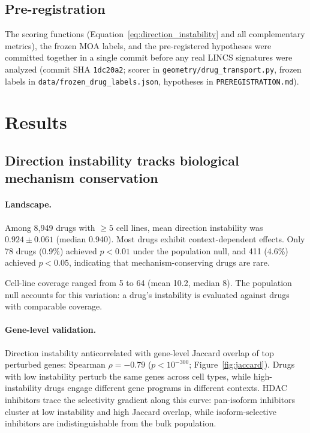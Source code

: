 \documentclass[11pt]{article}
\begin{document}
\subsection{Pre-registration}
\label{sec:prereg}

The scoring functions (Equation~\ref{eq:direction_instability} and all
complementary metrics), the frozen MOA labels, and the pre-registered
hypotheses were committed together in a single commit before any real
LINCS signatures were analyzed (commit SHA \texttt{1dc20a2}; scorer in
\texttt{geometry/drug\_transport.py}, frozen labels in
\texttt{data/frozen\_drug\_labels.json}, hypotheses in
\texttt{PREREGISTRATION.md}).

\section{Results}

\subsection{Direction instability tracks biological mechanism conservation}

\paragraph{Landscape.}

Among 8{,}949 drugs with $\geq5$ cell lines, mean direction instability
was $0.924 \pm 0.061$ (median 0.940). Most drugs exhibit context-dependent
effects. Only 78 drugs (0.9\%) achieved $p < 0.01$ under the population
null, and 411 (4.6\%) achieved $p < 0.05$, indicating that mechanism-conserving drugs are rare.

Cell-line coverage ranged from 5 to 64 (mean 10.2, median 8). The
population null accounts for this variation: a drug's instability is
evaluated against drugs with comparable coverage.

\paragraph{Gene-level validation.}

Direction instability anticorrelated with gene-level Jaccard overlap of
top perturbed genes: Spearman $\rho = -0.79$ ($p < 10^{-300}$;
Figure~\ref{fig:jaccard}). Drugs with low instability perturb the same
genes across cell types, while high-instability drugs engage different
gene programs in different contexts. HDAC inhibitors trace the
selectivity gradient along this curve: pan-isoform inhibitors cluster
at low instability and high Jaccard overlap, while isoform-selective
inhibitors are indistinguishable from the bulk population.
\end{document}
